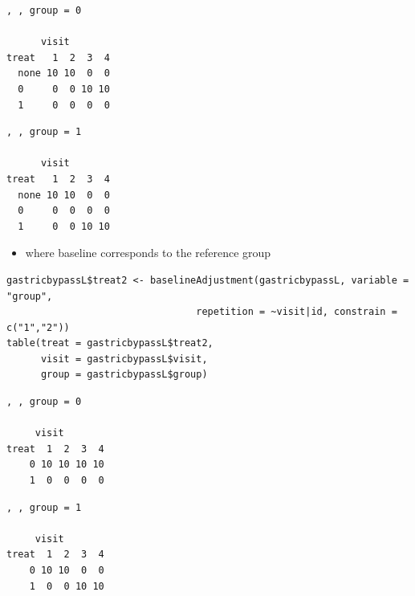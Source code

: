 \documentclass[12pt]{article}
\begin{document}
\begin{minipage}{0.45\linewidth}
\begin{verbatim}
, , group = 0

      visit
treat   1  2  3  4
  none 10 10  0  0
  0     0  0 10 10
  1     0  0  0  0
\end{verbatim}

\end{minipage}
\begin{minipage}{0.05\linewidth}
\hphantom{x}
\end{minipage}
\begin{minipage}{0.45\linewidth}
\begin{verbatim}
, , group = 1

      visit
treat   1  2  3  4
  none 10 10  0  0
  0     0  0  0  0
  1     0  0 10 10
\end{verbatim}


\end{minipage}


\begin{itemize}
\item where baseline corresponds to the reference group
\end{itemize}
\lstset{language=r,label= ,caption= ,captionpos=b,numbers=none}
\begin{lstlisting}
gastricbypassL$treat2 <- baselineAdjustment(gastricbypassL, variable = "group",
                                 repetition = ~visit|id, constrain = c("1","2"))
table(treat = gastricbypassL$treat2,
      visit = gastricbypassL$visit,
      group = gastricbypassL$group)
\end{lstlisting}

\begin{minipage}{0.45\linewidth}
\begin{verbatim}
, , group = 0

     visit
treat  1  2  3  4
    0 10 10 10 10
    1  0  0  0  0
\end{verbatim}

\end{minipage}
\begin{minipage}{0.05\linewidth}
\hphantom{x}
\end{minipage}
\begin{minipage}{0.45\linewidth}
\begin{verbatim}
, , group = 1

     visit
treat  1  2  3  4
    0 10 10  0  0
    1  0  0 10 10
\end{verbatim}


\end{minipage}
\end{document}
